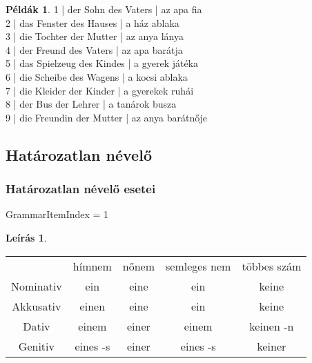 \documentclass{article}
\theoremstyle{definition}
\newtheorem*{exmp}{Példák}
\newtheorem*{desc}{Leírás}
\begin{document}
\begin{exmp}
1 | der Sohn des Vaters | az apa fia\\
2 | das Fenster des Hauses | a ház ablaka\\
3 | die Tochter der Mutter | az anya lánya\\
4 | der Freund des Vaters | az apa barátja\\
5 | das Spielzeug des Kindes | a gyerek játéka\\
6 | die Scheibe des Wagens | a kocsi ablaka\\
7 | die Kleider der Kinder | a gyerekek ruhái\\
8 | der Bus der Lehrer | a tanárok busza\\
9 | die Freundin der Mutter | az anya barátnője\\
\end{exmp}

\subsection{Határozatlan névelő}

\subsubsection{Határozatlan névelő esetei}

GrammarItemIndex = 1

\begin{desc}
\begin{tabular}{ccccc}
 & hímnem & nőnem & semleges nem & többes szám \\
 Nominativ & ein & eine & ein & keine \\
 Akkusativ & einen & eine & ein & keine \\
 Dativ & einem & einer & einem & keinen -n \\
 Genitiv & eines -s & einer & eines -s & keiner \\
\end{tabular}
\end{desc}
\end{document}
